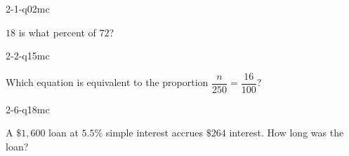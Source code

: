\begin{practiceQuestion}{2-1-q02}{mc}
\begin{questionText}
$18$ is what percent of $72$?
\end{questionText}
\end{practiceQuestion}

\begin{practiceQuestion}{2-2-q15}{mc}
\begin{questionText}
Which equation is equivalent to the proportion $\dfrac{n}{250} = \dfrac{16}{100}$?
\end{questionText}
\end{practiceQuestion}

\begin{practiceQuestion}{2-6-q18}{mc}
\begin{questionText}
A $\$1{,}600$ loan at $5.5\%$ simple interest accrues $\$264$ interest. How long was the loan?
\end{questionText}
\end{practiceQuestion}

